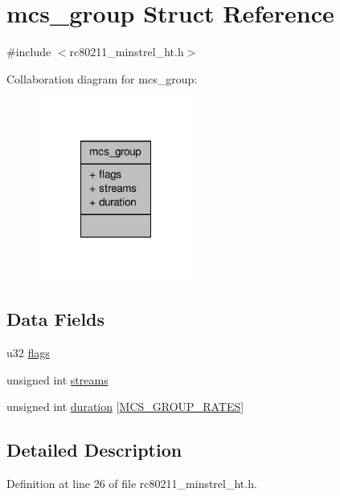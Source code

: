 \hypertarget{structmcs__group}{\section{mcs\-\_\-group Struct Reference}
\label{structmcs__group}
}


{\ttfamily \#include $<$rc80211\-\_\-minstrel\-\_\-ht.\-h$>$}



Collaboration diagram for mcs\-\_\-group\-:
\nopagebreak
\begin{figure}[H]
\begin{center}
\leavevmode
\includegraphics[width=144pt]{structmcs__group__coll__graph}
\end{center}
\end{figure}
\subsection*{Data Fields}
\begin{DoxyCompactItemize}
\item 
u32 \hyperlink{structmcs__group_a9fb2abd9f2594cefc48d6856e01f2879}{flags}
\item 
unsigned int \hyperlink{structmcs__group_af400861305cbf09d0a43140c4da1e152}{streams}
\item 
unsigned int \hyperlink{structmcs__group_a7a838228e55c3ac5d8d5395b20cf6a59}{duration} \mbox{[}\hyperlink{rc80211__minstrel__ht_8h_a1cce97ab419153d65e970112b74b5655}{M\-C\-S\-\_\-\-G\-R\-O\-U\-P\-\_\-\-R\-A\-T\-E\-S}\mbox{]}
\end{DoxyCompactItemize}


\subsection{Detailed Description}


Definition at line 26 of file rc80211\-\_\-minstrel\-\_\-ht.\-h.



